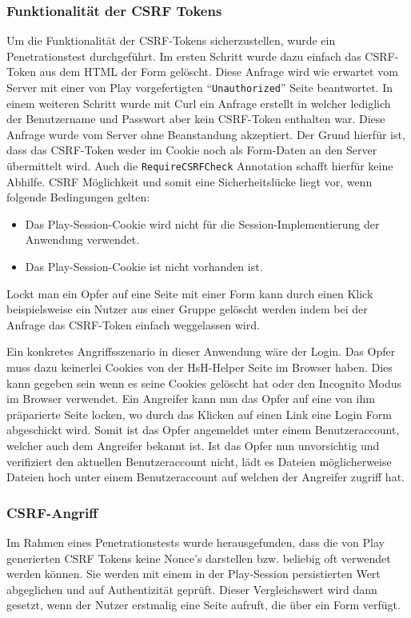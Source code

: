 \documentclass[12pt,DIV14,BCOR10mm,a4paper,parskip=half-,headsepline,headinclude,english,ngerman,bibliography=totocnumbered]{scrreprt}
\begin{document}
\subsubsection{Funktionalität der CSRF Tokens}
Um die Funktionalität der CSRF-Tokens sicherzustellen, wurde ein Penetrationstest durchgeführt. Im ersten Schritt wurde dazu einfach das CSRF-Token aus dem HTML der Form gelöscht. Diese Anfrage wird wie erwartet vom Server mit einer von Play vorgefertigten \enquote{\texttt{Unauthorized}} Seite beantwortet. In einem weiteren Schritt wurde mit Curl ein Anfrage erstellt in welcher lediglich der Benutzername und Passwort aber kein CSRF-Token enthalten war. Diese Anfrage wurde vom Server ohne Beanstandung akzeptiert. Der Grund hierfür ist, dass das CSRF-Token weder im Cookie noch als Form-Daten an den Server übermittelt wird. Auch die \texttt{RequireCSRFCheck} Annotation schafft hierfür keine Abhilfe. CSRF Möglichkeit und somit eine Sicherheitslücke liegt vor, wenn folgende Bedingungen gelten:

  \begin{itemize}
    \item Das Play-Session-Cookie wird nicht für die Session-Implementierung der Anwendung verwendet.
    \item Das Play-Session-Cookie ist nicht vorhanden ist.
  \end{itemize}

Lockt man ein Opfer auf eine Seite mit einer Form kann durch einen Klick beispielsweise ein Nutzer aus einer Gruppe gelöscht werden indem bei der Anfrage das CSRF-Token einfach weggelassen wird.

Ein konkretes Angriffsszenario in dieser Anwendung wäre der Login. Das Opfer muss dazu keinerlei Cookies von der HsH-Helper Seite im Browser haben. Dies kann gegeben sein wenn es seine Cookies gelöscht hat oder den Incognito Modus im Browser verwendet. Ein Angreifer kann nun das Opfer auf eine von ihm präparierte Seite locken, wo durch das Klicken auf einen Link eine Login Form abgeschickt wird. Somit ist das Opfer angemeldet unter einem Benutzeraccount, welcher auch dem Angreifer bekannt ist. Ist das Opfer nun unvorsichtig und verifiziert den aktuellen Benutzeraccount nicht, lädt es Dateien möglicherweise Dateien hoch unter einem Benutzeraccount auf welchen der Angreifer zugriff hat.

\subsubsection{CSRF-Angriff}
Im Rahmen eines Penetrationstests wurde herausgefunden, dass die von Play generierten CSRF Tokens keine Nonce's darstellen bzw. beliebig oft verwendet werden können. Sie werden mit einem in der Play-Session persistierten Wert abgeglichen und auf Authentizität geprüft. Dieser Vergleichswert wird dann gesetzt, wenn der Nutzer erstmalig eine Seite aufruft, die über ein Form verfügt.
\end{document}
